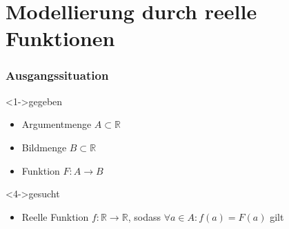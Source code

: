 \documentclass[table]{beamer}
\begin{document}
\section{Modellierung durch reelle Funktionen}
	\begin{frame}
	\frametitle{Ausgangssituation}
		\begin{block}<1->{gegeben}
			\begin{itemize}[<+->]
				\item Argumentmenge $A \subset \mathbb{R}$
				\item Bildmenge $B \subset \mathbb{R}$
				\item Funktion $F\colon A \to B$
			\end{itemize}
		\end{block}
		\begin{block}<4->{gesucht}
			\begin{itemize}
				\item Reelle Funktion $f : \mathbb{R} \to \mathbb{R}$, sodass $\forall a \in A \colon f(a) = F(a)$ gilt
			\end{itemize}
		\end{block}		
	\end{frame}
\end{document}
